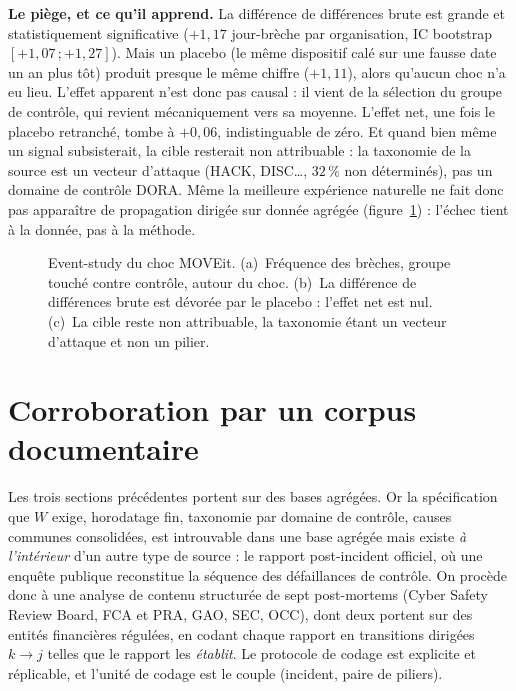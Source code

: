 \begin{attention}
\textbf{Le piège, et ce qu'il apprend.} La différence de différences brute est grande et
statistiquement significative ($+1{,}17$ jour-brèche par organisation, IC bootstrap
$[+1{,}07\,;+1{,}27]$). Mais un placebo (le même dispositif calé sur une fausse
date un an plus tôt) produit presque le même chiffre ($+1{,}11$), alors qu'aucun choc n'a
eu lieu. L'effet apparent n'est donc pas causal : il vient de la sélection du groupe de
contrôle, qui revient mécaniquement vers sa moyenne. L'effet net, une fois le
placebo retranché, tombe à $+0{,}06$, indistinguable de zéro. Et quand bien même un signal
subsisterait, la cible resterait non attribuable : la taxonomie de la source est un vecteur
d'attaque (HACK, DISC\dots, $32\,\%$ non déterminés), pas un domaine de contrôle DORA. Même
la meilleure expérience naturelle ne fait donc pas apparaître de propagation dirigée sur
donnée agrégée (figure~\ref{fig:moveit}) : l'échec tient à la donnée, pas à la méthode.
\end{attention}

\begin{figure}[htbp]
\centering
{}
\caption{Event-study du choc MOVEit. (a)~Fréquence des brèches, groupe touché contre
contrôle, autour du choc. (b)~La différence de différences brute est dévorée par le
placebo : l'effet net est nul. (c)~La cible reste non attribuable, la taxonomie étant un
vecteur d'attaque et non un pilier.}
\label{fig:moveit}
\end{figure}


\section{Corroboration par un corpus documentaire}

Les trois sections précédentes portent sur des bases agrégées. Or la spécification que
$W$ exige, horodatage fin, taxonomie par domaine de contrôle, causes communes consolidées, est
introuvable dans une base agrégée mais existe \emph{à l'intérieur} d'un autre type de source :
le rapport post-incident officiel, où une enquête publique reconstitue la séquence des
défaillances de contrôle. On procède donc à une analyse de contenu structurée de sept
post-mortems (Cyber Safety Review Board, FCA et PRA, GAO, SEC, OCC), dont deux portent sur des
entités financières régulées, en codant chaque rapport en transitions dirigées $k \to j$ telles
que le rapport les \emph{établit}. Le protocole de codage est explicite et réplicable, et
l'unité de codage est le couple (incident, paire de piliers).

